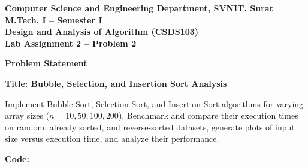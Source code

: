 \documentclass[12pt]{article}
\begin{document}
\begin{center}
\textbf{Computer Science and Engineering Department, SVNIT, Surat}\\
\textbf{M.Tech. I -- Semester I}\\
\textbf{Design and Analysis of Algorithm (CSDS103)}\\
\textbf{Lab Assignment 2 -- Problem 2}
\end{center}

\vspace{0.4cm}

\textbf{Problem Statement}

\textbf{Title: Bubble, Selection, and Insertion Sort Analysis}

Implement Bubble Sort, Selection Sort, and Insertion Sort algorithms for varying array sizes ($n = 10, 50, 100, 200$). Benchmark and compare their execution times on random, already sorted, and reverse-sorted datasets, generate plots of input size versus execution time, and analyze their performance.

\vspace{0.3cm}

\textbf{Code:}
\end{document}
